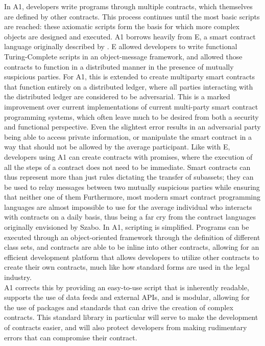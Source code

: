 \documentclass[conference]{IEEEtran}
\begin{document}
 In A1, developers write programs through multiple contracts, which themselves are defined by other contracts. This process continues until the most basic scripts are reached: these axiomatic scripts form the basis for which more complex objects are designed and executed. A1 borrows heavily from E, a smart contract language originally described by \cite{miller1997E}. E allowed developers to write functional Turing-Complete scripts in an object-message framework, and allowed those contracts to function in a distributed manner in the presence of mutually suspicious parties. For A1, this is extended to create multiparty smart contracts that function entirely on a distributed ledger, where all parties interacting with the distributed ledger are considered to be adversarial. This is a marked improvement over current implementations of current multi-party smart contract programming systems,  which often leave much to be desired from both a security and functional perspective. Even the slightest error results in an adversarial party being able to access  private information, or manipulate the smart contract in a way that should not be allowed by the average participant. Like with E, developers using A1 can create contracts with promises, where the execution of all the steps of a contract does not need to be immediate. Smart contracts can thus represent more than just rules dictating the transfer of subassets; they can be used to relay messages between two mutually suspicious parties while ensuring that neither one of them  Furthermore, most modern smart contract programming languages are almost impossible to use for the average individual who interacts with contracts on a daily basis, thus being a far cry from the contract languages originally envisioned by Szabo. In A1, scripting is simplified. Programs can be executed through an object-oriented framework through the definition of different class sets, and contracts are able to be inline into other contracts, allowing for an efficient development platform that allows developers to utilize other contracts to create their own contracts, much like how standard forms are used in the legal industry.\\

A1 corrects this by providing an easy-to-use script that is inherently readable, supports the use of data feeds and external APIs, and is modular, allowing for the use of packages and standards that can drive the creation of complex contracts. This standard library in particular will serve to make the development of contracts easier, and will also protect developers from making rudimentary errors that can compromise their contract. 
\end{document}
